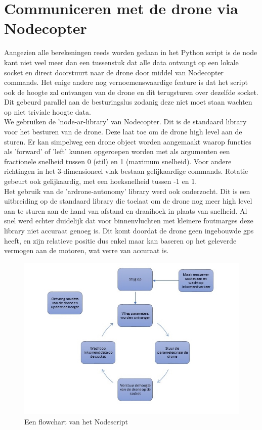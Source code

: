 \section{Communiceren met de drone via Nodecopter}


Aangezien alle berekeningen reeds worden gedaan in het Python script is de node kant niet veel meer dan een tussenstuk dat alle data ontvangt op een lokale socket en direct doorstuurt naar de drone door middel van Nodecopter commands. Het enige andere nog vernoemenswaardige feature is dat het script ook de hoogte zal ontvangen van de drone en dit terugsturen over dezelfde socket. Dit gebeurd parallel aan de besturingslus zodanig deze niet moet staan wachten op niet triviale hoogte data.\\

We gebruiken de 'node-ar-library' van Nodecopter. Dit is de standaard library voor het besturen van de drone. Deze laat toe om de drone high level aan de sturen. Er kan simpelweg een drone object worden aangemaakt waarop functies als 'forward' of 'left' kunnen opgeroepen worden met als argumenten een fractionele snelheid tussen 0 (stil) en 1 (maximum snelheid). Voor andere richtingen in het 3-dimensioneel vlak bestaan gelijkaardige commands. Rotatie gebeurt ook gelijkaardig, met een hoeksnelheid tussen -1 en 1.\\

Het gebruik van de 'ardrone-autonomy' library werd ook onderzocht. Dit is een uitbreiding op de standaard library die toelaat om de drone nog meer high level aan te sturen aan de hand van afstand en draaihoek in plaats van snelheid. Al snel werd echter duidelijk dat voor binnenvluchten met kleinere foutmarges deze library niet accuraat genoeg is. Dit komt doordat de drone geen ingebouwde gps heeft, en zijn relatieve positie dus enkel maar kan baseren op het geleverde vermogen aan de motoren, wat verre van accuraat is.



\begin{figure}[h]
\caption{Een flowchart van het Nodescript}
\centering
\includegraphics[width=\textwidth]{images/node_server_flowchart}
\end{figure}

